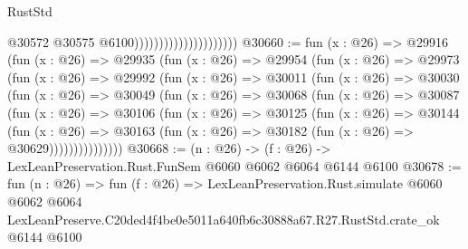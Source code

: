 \begin{lexlean}{RustStd}
\begin{coremodule}
                                              @30572
                                              @30575
                                              @6100)))))))))))))))))))))
@30660 := fun (x : @26) =>
  @29916
    (fun (x : @26) =>
    @29935
      (fun (x : @26) =>
      @29954
        (fun (x : @26) =>
        @29973
          (fun (x : @26) =>
          @29992
            (fun (x : @26) =>
            @30011
              (fun (x : @26) =>
              @30030
                (fun (x : @26) =>
                @30049
                  (fun (x : @26) =>
                  @30068
                    (fun (x : @26) =>
                    @30087
                      (fun (x : @26) =>
                      @30106
                        (fun (x : @26) =>
                        @30125
                          (fun (x : @26) =>
                          @30144
                            (fun (x : @26) =>
                            @30163 (fun (x : @26) => @30182 (fun (x : @26) => @30629)))))))))))))))
@30668 := (n : @26) -> (f : @26) -> LexLeanPreservation.Rust.FunSem @6060 @6062 @6064 @6144 @6100
@30678 := fun (n : @26) =>
  fun (f : @26) =>
  LexLeanPreservation.Rust.simulate
    @6060
    @6062
    @6064
    LexLeanPreserve.C20ded4f4be0e5011a640fb6c30888a67.R27.RustStd.crate_ok
    @6144
    @6100
\end{coremodule}
\end{lexlean}
